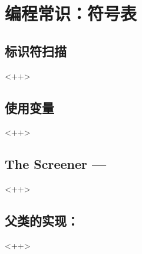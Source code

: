 

\chapter{编程常识：符号表}
\label{ch:psSymbolTable}

\section{标识符扫描}<++>

\section{使用变量}<++>

\section{The Screener ---}<++>

\section{父类的实现：}<++>

